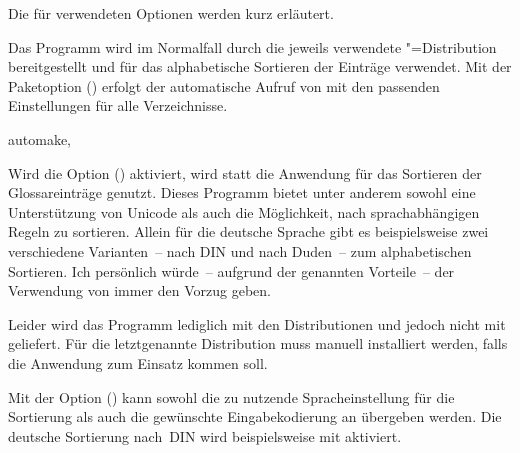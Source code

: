 \documentclass[%
  english,ngerman,%
  cdgeometry=no,DIV=12,automark,%
]{tudscrartcl}
\begin{document}
Die für  verwendeten Optionen werden kurz erläutert.
%
\begin{Preamble+}
\AfterPackage*{hyperref}{%
\end{Preamble+}
\begin{Preamble}
\usepackage[%
\end{Preamble}
%
Das Programm  wird im Normalfall durch die jeweils 
verwendete "=Distribution bereitgestellt und für das 
alphabetische Sortieren der Einträge verwendet. Mit der Paketoption 
() erfolgt der automatische Aufruf von 
 mit den passenden Einstellungen für alle Verzeichnisse. 
%
\begin{Preamble}
  automake,%
\end{Preamble}
%
Wird die Option () aktiviert, wird statt 
 die Anwendung  für das Sortieren der 
Glossareinträge genutzt. Dieses Programm bietet unter anderem sowohl eine 
Unterstützung von Unicode als auch die Möglichkeit, nach sprachabhängigen 
Regeln zu sortieren. Allein für die deutsche Sprache gibt es beispielsweise 
zwei verschiedene Varianten~-- nach DIN und nach Duden~-- zum alphabetischen 
Sortieren. Ich persönlich würde~-- aufgrund der genannten Vorteile~-- der 
Verwendung von  immer den Vorzug geben.

Leider wird das Programm  lediglich mit den Distributionen 
 und  jedoch 
nicht mit  geliefert. Für die letztgenannte 
Distribution muss  manuell installiert werden, falls die 
Anwendung zum Einsatz kommen soll.
%
\begin{Preamble}
\end{Preamble}
%
Mit der Option () kann sowohl die zu nutzende 
Spracheinstellung für die Sortierung als auch die gewünschte Eingabekodierung 
an  übergeben werden. Die deutsche Sortierung nach~DIN wird 
beispielsweise mit  aktiviert.
\end{document}
